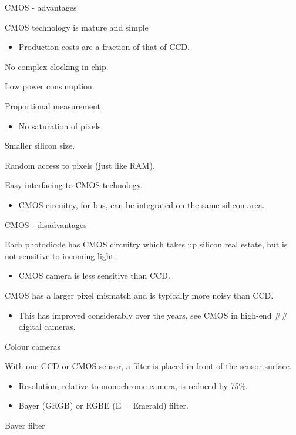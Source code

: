 \documentclass[compress]{beamer}
\providecommand{\tightlist}{%
  \setlength{\itemsep}{0pt}\setlength{\parskip}{0pt}}
\begin{document}
\begin{frame}{CMOS - advantages}

CMOS technology is mature and simple

\begin{itemize}
\tightlist
\item
  Production costs are a fraction of that of CCD.
\end{itemize}

No complex clocking in chip.

Low power consumption.

Proportional measurement

\begin{itemize}
\tightlist
\item
  No saturation of pixels.
\end{itemize}

Smaller silicon size.

Random access to pixels (just like RAM).

Easy interfacing to CMOS technology.

\begin{itemize}
\tightlist
\item
  CMOS circuitry, \eg for bus, can be integrated on the same silicon
  area.
\end{itemize}

\end{frame}

\begin{frame}{CMOS - disadvantages}

Each photodiode has CMOS circuitry which takes up silicon real estate,
but is not sensitive to incoming light.

\begin{itemize}
\tightlist
\item
  CMOS camera is less sensitive than CCD.
\end{itemize}

CMOS has a larger pixel mismatch and is typically more noisy than CCD.

\begin{itemize}
\tightlist
\item
  This has improved considerably over the years, see CMOS in high-end
  \#\# digital cameras.
\end{itemize}

\end{frame}

\begin{frame}{Colour cameras}

With one CCD or CMOS sensor, a filter is placed in front of the sensor
surface.

\begin{itemize}
\tightlist
\item
  Resolution, relative to monochrome camera, is reduced by 75\%.
\item
  Bayer (GRGB) or RGBE (E = Emerald) filter.
\end{itemize}

Bayer filter

\end{frame}
\end{document}
